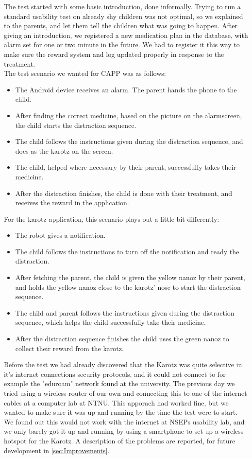 The test started with some basic introduction, done informally. Trying to run a standard usability test on already shy children was not optimal, so we explained to the parents, and let them tell the children what was going to happen. After giving an introduction, we registered a new medication plan in the database, with alarm set for one or two minute in the future. We had to register it this way to make sure the reward system and log updated properly in response to the treatment.\\ 
The test scenario we wanted for CAPP was as follows:
\begin{itemize}
	\item The Android device receives an alarm. The parent hands the phone to the child.
	\item After finding the correct medicine, based on the picture on the alarmscreen, the child starts the distraction sequence.
	\item The child follows the instructions given during the distraction sequence, and does as the karotz on the screen.
	\item The child, helped where necessary by their parent, successfully takes their medicine.
	\item After the distraction finishes, the child is done with their treatment, and receives the reward in the application.
\end{itemize}
For the karotz application, this scenario plays out a little bit differently:
\begin{itemize}
	\item The robot gives a notification.
	\item The child follows the instructions to turn off the notification and ready the distraction.
	\item After fetching the parent, the child is given the yellow nanoz by their parent, and holds the yellow nanoz close to the karotz' nose to start the distraction sequence.
	\item The child and parent follows the instructions given during the distraction sequence, which helps the child successfully take their medicine.
	\item After the distraction sequence finishes the child uses the green nanoz to collect their reward from the karotz.
\end{itemize}

Before the test we had already discovered that the Karotz was quite selective in it's internet connections security protocols, and it could not connect to for example the "eduroam"
network found at the university. The previous day we tried using a wireless router of our own and connecting this to one of the internet cables at a computer lab at NTNU. This apporach had worked fine, but we wanted to make sure it was up and running by the time the test were to start. We found out this would not
work with the internet at NSEPs usability lab, and we only barely got it up and running by using a smartphone to set up a wireless hotspot for the Karotz. A description of the problems are reported, for future development in \ref{sec:Improvements}. 

